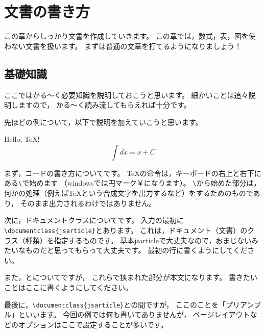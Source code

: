 \chapter{文書の書き方}
\label{ch:plane-text}

この章からしっかり文書を作成していきます。
この章では，数式，表，図を使わない文書を扱います。
まずは普通の文章を打てるようになりましょう！



\section{基礎知識}
ここではかる～く必要知識を説明しておこうと思います。
細かいことは追々説明しますので，
かる～く読み流してもらえれば十分です。

先ほどの例について，以下で説明を加えていこうと思います。

\begin{IOtcb}
\tcblower

Hello, \TeX !
\[ \int dx= x + C \]

\end{IOtcb}

まず，コードの書き方についてです。
{\TeX}の命令は，キーボードの右上と右下にある\verb|\|で始めます
（windowsでは円マーク￥になります）。
\verb|\|から始めた部分は，
何かの処理（例えば{\TeX}という合成文字を出力するなど）をするためのものであり，
そのまま出力されるわけではありません。

次に，ドキュメントクラスについてです。
入力の最初に\verb|\documentclass{jsarticle}|とあります。
これは，ドキュメント（文書）のクラス（種類）を指定するものです。
基本jsarticleで大丈夫なので，おまじないみたいなものだと思ってもらって大丈夫です。
最初の行に書くようにしてください。

また，\verb||と\verb||についてですが，
これらで挟まれた部分が本文になります。
書きたいことはここに書くようにしてください。

最後に，\verb|\documentclass{jsarticle}|と\verb||の間ですが，
ここのことを「プリアンブル」といいます。
今回の例では何も書いてありませんが，
ページレイアウトなどのオプションはここで設定することが多いです。\\



